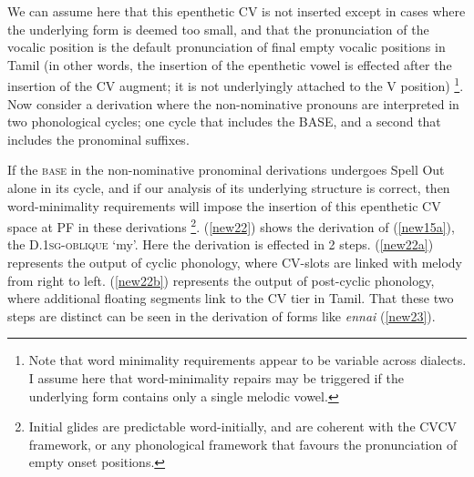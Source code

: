 \documentclass[output=paper,colorlinks,citecolor=brown,
]{langscibook}
\begin{document}
We can assume here that this epenthetic CV is not inserted except in cases where the underlying form is deemed too small, and that the pronunciation of the vocalic position is the default pronunciation of final empty vocalic positions in Tamil (in other words, the insertion of the epenthetic vowel is effected after the insertion of the CV augment; it is not underlyingly attached to the V position) \footnote{Note that word minimality requirements appear to be variable across dialects. I assume here that word-minimality repairs may be triggered if the underlying form contains only a single melodic vowel.}.  Now consider a derivation where the non-nominative pronouns are interpreted in two phonological cycles; one cycle that includes the BASE, and a second that includes the pronominal suffixes. 

If the \textsc{base} in the non-nominative pronominal derivations undergoes Spell Out alone in its cycle, and if our analysis of its underlying structure is correct, then word-minimality requirements will impose the insertion of this epenthetic CV space at PF in these derivations \footnote{Initial glides are predictable word-initially, and are coherent with the CVCV framework, or any phonological framework that favours the pronunciation of empty onset positions.}.  (\ref{new22}) shows the derivation of (\ref{new15a}), the D.1\textsc{sg-oblique} ‘my’. Here the derivation is effected in 2 steps. (\ref{new22a}) represents the output of cyclic phonology, where CV-slots are linked with melody from right to left. (\ref{new22b}) represents the output of post-cyclic phonology, where additional floating segments link to the CV tier in Tamil. That these two steps are distinct can be seen in the derivation of forms like \textit{ennai} (\ref{new23}).
\end{document}
